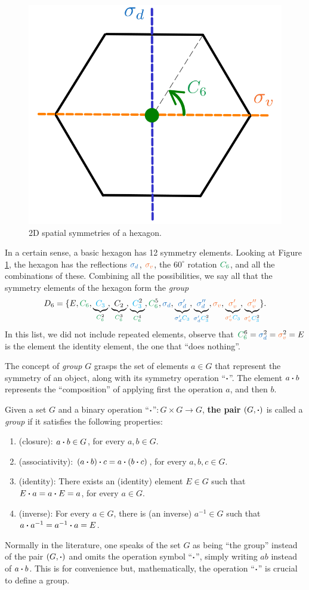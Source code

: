 \begin{figure}[H]
\centering
\includegraphics[width=0.4\linewidth]{fig/hexagon.png}
\caption{2D spatial symmetries of a hexagon.}
\label{fig:hexagon}
\end{figure}

\begin{example}
In a certain sense, a basic hexagon has 12 symmetry elements. Looking at Figure \ref{fig:hexagon}, the hexagon has the reflections $\sd$, $\sv$, the $60^\circ$ rotation $\Cs$, and all the combinations of these. Combining all the possibilities, we say all that the symmetry elements of the hexagon form the \textit{group}
$$
D_6 = \{E, \Cs, \underbrace{\Ct}_{\Csn{2}}, \underbrace{C_2}_{\Csn{3}}, \underbrace{\Ctn{2}}_{\Csn{4}}, \Csn{5}, \sd, \underbrace{\sdp}_{\sdp \Ct}, \underbrace{\sdpp}_{\sdp \Ctn{2}}, \sv, \underbrace{\svp}_{\svp \Ct}, \underbrace{\svpp}_{\svp \Ctn{2}} \}.
$$
In this list, we did not include repeated elements, observe that $\Csn{6} = \sdn{2} = \svn{2} = E$ is the element the identity element, the one that ``does nothing''.
\end{example}


The concept of \textit{group} $G$ grasps the set of elements $a \in G$ that represent the symmetry of an object, along with its symmetry operation ``$\vdot$''. The element $a \vdot b$ represents the ``composition'' of applying first the operation $a$, and then $b$.

\begin{definition}
Given a set $G$ and a binary operation ``$\vdot$''$:G\times G \to G$, \textbf{the pair} $(G, \vdot)$ is called a \textit{group} if it satisfies the following properties:
\begin{enumerate}
\item (closure): $a \vdot b \in G$, for every $a, b \in G$.
\item (associativity): $(a \vdot b) \vdot c =  a \vdot (b \vdot c)$, for every $a, b, c \in G$.
\item (identity): There exists an (identity) element $E \in G$ such that $E \vdot a = a \vdot E = a$, for every $a \in G$.
\item (inverse): For every $a \in G$, there is (an inverse) $a^{-1} \in G$ such that $a \vdot a^{-1} = a^{-1} \vdot a = E$.
\end{enumerate}
\end{definition}
Normally in the literature, one speaks of the set $G$ as being ``the group'' instead of the pair $(G, \vdot)$ and omits the operation symbol ``$\vdot$'', simply writing $ab$ instead of $a \vdot b$. This is for convenience but, mathematically, the operation ``$\vdot$'' is crucial to define a group.

